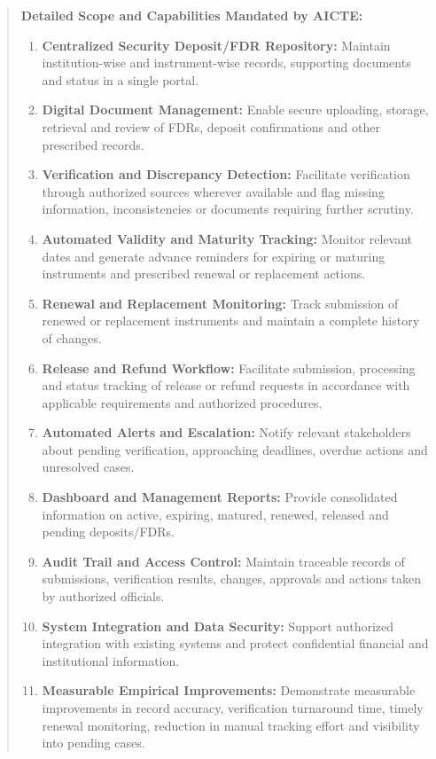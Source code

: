 \documentclass[12pt, a4paper]{report}
\begin{document}
\begin{quote}
\vspace{0.4cm}
\textbf{Detailed Scope and Capabilities Mandated by AICTE:}
\begin{enumerate}[leftmargin=2.5em]
  \item \textbf{Centralized Security Deposit/FDR Repository:} Maintain institution-wise and instrument-wise records, supporting documents and status in a single portal.
  \item \textbf{Digital Document Management:} Enable secure uploading, storage, retrieval and review of FDRs, deposit confirmations and other prescribed records.
  \item \textbf{Verification and Discrepancy Detection:} Facilitate verification through authorized sources wherever available and flag missing information, inconsistencies or documents requiring further scrutiny.
  \item \textbf{Automated Validity and Maturity Tracking:} Monitor relevant dates and generate advance reminders for expiring or maturing instruments and prescribed renewal or replacement actions.
  \item \textbf{Renewal and Replacement Monitoring:} Track submission of renewed or replacement instruments and maintain a complete history of changes.
  \item \textbf{Release and Refund Workflow:} Facilitate submission, processing and status tracking of release or refund requests in accordance with applicable requirements and authorized procedures.
  \item \textbf{Automated Alerts and Escalation:} Notify relevant stakeholders about pending verification, approaching deadlines, overdue actions and unresolved cases.
  \item \textbf{Dashboard and Management Reports:} Provide consolidated information on active, expiring, matured, renewed, released and pending deposits/FDRs.
  \item \textbf{Audit Trail and Access Control:} Maintain traceable records of submissions, verification results, changes, approvals and actions taken by authorized officials.
  \item \textbf{System Integration and Data Security:} Support authorized integration with existing systems and protect confidential financial and institutional information.
  \item \textbf{Measurable Empirical Improvements:} Demonstrate measurable improvements in record accuracy, verification turnaround time, timely renewal monitoring, reduction in manual tracking effort and visibility into pending cases.
\end{enumerate}
\end{quote}
\end{document}

